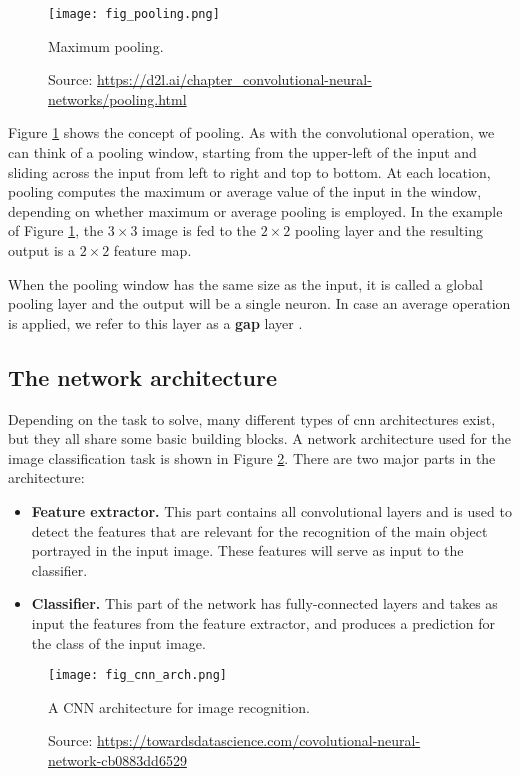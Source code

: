 \begin{figure}[ht]
    \begin{center}       
    \texttt{[image: fig\_pooling.png]}
    \caption[Maximum pooling]{Maximum pooling.}
    \caption*{Source: \href{https://d2l.ai/chapter\_convolutional-neural-networks/pooling.html}{https://d2l.ai/chapter\_convolutional-neural-networks/pooling.html}}
    \label{fig:pooling}
    \end{center}
\end{figure}

Figure \ref{fig:pooling} shows the concept of pooling. As with the convolutional operation, we can think of a pooling window, starting from the upper-left of the input and sliding across the input from left to right and top to bottom. At each location, pooling computes the maximum or average value of the input in the window, depending on whether maximum or average pooling is employed. In the example of Figure \ref{fig:pooling}, the $3 \times 3$ image is fed to the $2 \times 2$ pooling layer and the resulting output is a $2 \times 2$ feature map.

When the pooling window has the same size as the input, it is called a global pooling layer and the output will be a single neuron. In case an average operation is applied, we refer to this layer as a \textbf{\acrfull{gap}} layer \cite{lin2013network}.


\subsection{The network architecture}
Depending on the task to solve, many different types of \acrshort{cnn} architectures exist, but they all share some basic building blocks. A network architecture used for the image classification task is shown in Figure \ref{fig:cnn_arch}. There are two major parts in the architecture:
\begin{itemize}
\item \textbf{Feature extractor.} This part contains all convolutional layers and is used to detect the features that are relevant for the recognition of the main object portrayed in the input image. These features will serve as input to the classifier.
\item \textbf{Classifier.} This part of the network has fully-connected layers and takes as input the features from the feature extractor, and produces a   prediction for the class of the input image.
\end{itemize}
\begin{figure}[ht]
    \begin{center}       
    \texttt{[image: fig\_cnn\_arch.png]}
    \caption[A CNN architecture for image recognition]{A CNN architecture for image recognition.}
    \caption*{Source: \href{https://towardsdatascience.com/covolutional-neural-network-cb0883dd6529}{https://towardsdatascience.com/covolutional-neural-network-cb0883dd6529}}
    \label{fig:cnn_arch}
    \end{center}
\end{figure}

